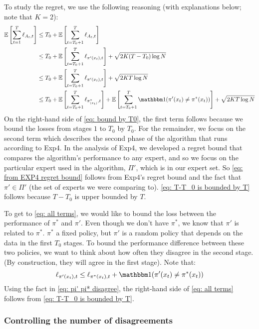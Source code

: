 \documentclass[11pt]{article}
\begin{document}
To study the regret, we use the following reasoning (with explanations below; note that $K=2$):
\begin{align}
\E{\sum_{t=1}^T\ell_{A_t,t}} &\le T_0 +\E{\sum_{t=T_0+1}^T\ell_{A_t,t}}\label{eq: bound by T0}\\
& \le T_0 + \E{\sum_{t=T_0+1}^T\ell_{\pi'(x_t),t}}+ \sqrt{2K(T-T_0) \log{N}} \label{eq: from EXP4 regret bound}\\
& \le T_0 + \E{\sum_{t=T_0+1}^T\ell_{\pi'(x_t),t}}+  \sqrt{2KT\log{N}}\label{eq: T-T_0 is bounded by T}\\
&\le T_0 + \E{\sum_{t=T_0+1}^T \ell_{\pi^*_{(x_t)},t}} + \E{\sum_{t=T_0+1}^T{\ind(\pi'(x_t)\neq \pi^*(x_t))}} + \sqrt{2KT\log{N}}
\label{eq: all terms}
\end{align}
On the right-hand side of \eqref{eq: bound by T0}, the first term follows because we bound the losses from stages $1$ to $T_0$ by $T_0$. For the remainder, we focus on the second term which describes the second phase of the algorithm that runs according to Exp4. In the analysis of Exp4, we developed a regret bound that compares the algorithm's performance to any expert, and so we focus on the particular expert used in the algorithm, $\Pi'$, which is in our expert set. So \eqref{eq: from EXP4 regret bound} follows from Exp4's regret bound and the fact that $\pi' \in \Pi'$ (the set of experts we were comparing to). \eqref{eq: T-T_0 is bounded by T} follows because $T-T_0$ is upper bounded by $T$. 

To get to \eqref{eq: all terms}, we would like to bound the loss between the performance of $\pi^*$ and $\pi'$. Even though we don't have $\pi^*$, we know that $\pi'$ is related to $\pi^*$. $\pi^*$ a fixed policy, but $\pi'$ is a random policy that depends on the data in the first $T_0$ stages. To bound the performance difference between these two policies, we want to think about how often they disagree in the second stage. (By construction, they will agree in the first stage). Note that:
\begin{equation}
\ell_{\pi'(x_t),t}\le \ell_{\pi^*(x_t),t} + \ind(\pi'(x_t)\neq \pi^*(x_t))\label{eq: pi' pi* disagree}
\end{equation}
Using the fact in \eqref{eq: pi' pi* disagree}, the right-hand side of \eqref{eq: all terms} follows from \eqref{eq: T-T_0 is bounded by T}. 

\subsubsection{Controlling the number of disagreements}
\end{document}
